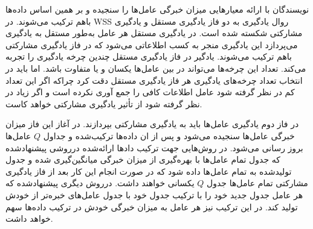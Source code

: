 نویسندگان با ارائه معیارهایی میزان خبرگی عامل‌ها را سنجیده و بر همین اساس داده‌ها باهم ترکیب می‌شوند. در WSS روال یادگیری به دو فاز یادگیری مستقل و یادگیری مشارکتی شکسته شده است.
در یادگیری مستقل هر عامل به‌طور مستقل به یادگیری می‌پردازد این یادگیری منجر به کسب اطلاعاتی می‌شود که در فاز یادگیری مشارکتی باهم ترکیب می‌شوند. یادگیر در فاز یادگیری مستقل چندین چرخه یادگیری را تجربه می‌کند. تعداد این چرخه‌ها می‌تواند در بین عامل‌ها یکسان و یا متفاوت باشد. اما باید در انتخاب تعداد چرخه‌های یادگیری هر فاز یادگیری مستقل دقت کرد چراکه اگر این تعداد کم در نظر گرفته شود عامل اطلاعات کافی را جمع آوری نکرده است و اگر زیاد در نظر گرفته شود از تأثیر یادگیری مشارکتی خواهد کاست.

در فاز دوم یادگیری عامل‌ها باید به یادگیری مشارکتی بپردازند. در آغاز این فاز میزان خبرگی عامل‌ها سنجیده می‌شود و پس از ان داده‌ها ترکیب‌شده و جداول $Q$ عامل‌ها بروز رسانی می‌شود. در روش‌هایی جهت ترکیب دادها ارائه‌شده درروشی پیشنهادشده که جدول تمام عامل‌ها با بهره‌گیری از میزان خبرگی میانگین‌گیری شده و جدول تولیدشده به تمام عامل‌ها داده شود که در صورت انجام این کار بعد از فاز یادگیری مشارکتی تمام عامل‌ها جدول $Q$ یکسانی خواهند داشت. درروش دیگری پیشنهادشده که هر عامل جدول جدید خود را با ترکیب جدول خود با جدول عامل‌های خبره‌تر از خودش تولید کند. در این ترکیب نیز هر عامل به میزان خبرگی خودش در ترکیب داده‌ها سهم خواهد داشت.

